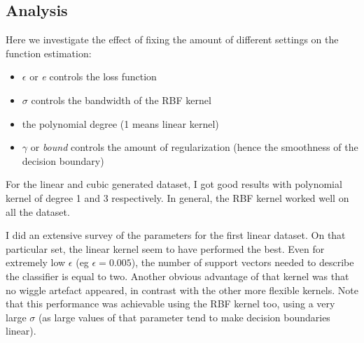 \documentclass[11pt, a4paper]{article}
\begin{document}
\subsection{Analysis}

Here we investigate the effect of fixing the amount of different
settings on the function estimation:

\begin{itemize}
\item $\epsilon$ or \emph{e} controls the loss function
\item $\sigma$ controls the bandwidth of the RBF kernel
\item the polynomial degree (1 means linear kernel)
\item $\gamma$ or \emph{bound} controls the amount of regularization
  (hence the smoothness of the decision boundary)
\end{itemize}

For the linear and cubic generated dataset, I got good results with
polynomial kernel of degree 1 and 3 respectively. In general, the RBF
kernel worked well on all the dataset.

I did an extensive survey of the parameters for the first linear
dataset. On that particular set, the linear kernel seem to have
performed the best. Even for extremely low $\epsilon$ (eg
$\epsilon=0.005$), the number of support vectors needed to describe
the classifier is equal to two. Another obvious advantage of that
kernel was that no wiggle artefact appeared, in contrast with the
other more flexible kernels. Note that this performance was achievable
using the RBF kernel too, using a very large $\sigma$ (as large values
of that parameter tend to make decision boundaries linear).
\end{document}
